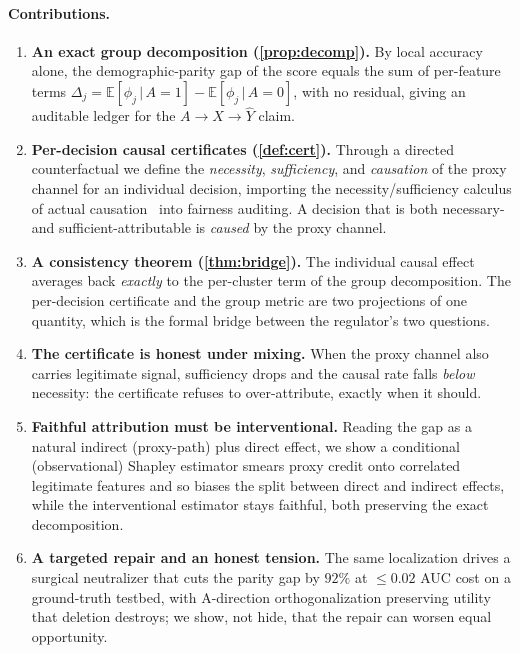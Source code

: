 \documentclass[sn-mathphys-num]{sn-jnl}
\newcommand{\Exp}{\mathbb{E}}
\newcommand{\given}{\,\vert\,}
\begin{document}
\paragraph{Contributions.}
\begin{enumerate}[leftmargin=1.6em,itemsep=0.22em,topsep=0.25em]
  \item \textbf{An exact group decomposition (\cref{prop:decomp}).} By
        local accuracy alone, the demographic-parity gap of the score equals the
        sum of per-feature terms $\Delta_j=\Exp[\phi_j\given A{=}1]-\Exp[\phi_j\given A{=}0]$,
        with no residual, giving an auditable ledger for the $A\!\to\!X\!\to\!\hat Y$
        claim.
  \item \textbf{Per-decision causal certificates (\cref{def:cert}).} Through a
        directed counterfactual we define the \emph{necessity}, \emph{sufficiency},
        and \emph{causation} of the proxy channel for an individual decision,
        importing the necessity/sufficiency calculus of actual
        causation~\cite{halpern2005causes,watson2021local} into fairness auditing.
        A decision that is both necessary- and sufficient-attributable is
        \emph{caused} by the proxy channel.
  \item \textbf{A consistency theorem (\cref{thm:bridge}).} The individual causal
        effect averages back \emph{exactly} to the per-cluster term of the group
        decomposition. The per-decision certificate and the group metric are two
        projections of one quantity, which is the formal bridge between the regulator's
        two questions.
  \item \textbf{The certificate is honest under mixing.} When the proxy channel
        also carries legitimate signal, sufficiency drops and the causal rate
        falls \emph{below} necessity: the certificate refuses to over-attribute,
        exactly when it should.
  \item \textbf{Faithful attribution must be interventional.} Reading the gap as
        a natural indirect (proxy-path) plus direct effect, we show a conditional
        (observational) Shapley estimator smears proxy credit onto correlated
        legitimate features and so biases the split between direct and indirect effects, while the
        interventional estimator stays faithful, both preserving the exact
        decomposition.
  \item \textbf{A targeted repair and an honest tension.} The same localization
        drives a surgical neutralizer that cuts the parity gap by $92\%$ at
        $\le0.02$ AUC cost on a ground-truth testbed, with A-direction
        orthogonalization preserving utility that deletion destroys; we show, not
        hide, that the repair can worsen equal opportunity.
\end{enumerate}
\end{document}
